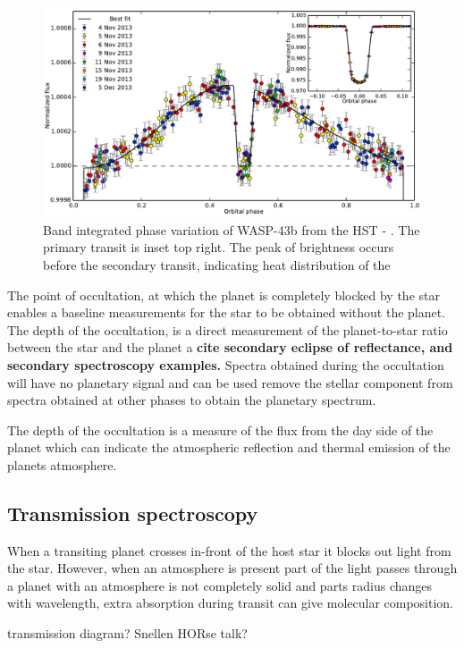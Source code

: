 \begin{figure}
    \centering
    \includegraphics[width=0.6\linewidth]{figures/introduction/stevenson_phasecurve2014}
    \caption{Band integrated phase variation of WASP-43b from the HST - \cite{stevenson_thermal_2014}. The primary transit is inset top right.
        The peak of brightness occurs before the secondary transit, indicating heat distribution of the }
    \label{fig:stevensonphasecurve2014}
\end{figure}

The point of occultation, at which the planet is completely blocked by the star enables a baseline measurements for the star to be obtained without the planet. The depth of the occultation, is a direct measurement of the planet-to-star ratio between the star and the planet a \textbf{{cite secondary eclipse of reflectance, and secondary spectroscopy examples}.} Spectra obtained during the occultation will have no planetary signal and can be used remove the stellar component from spectra obtained at other phases to obtain the planetary spectrum.


The depth of the occultation is a measure of the flux from the day side of the planet which can indicate the atmospheric reflection and thermal emission of the planets atmosphere.





\subsection{Transmission spectroscopy}
When a transiting planet crosses in-front of the host star it blocks out light from the star. However, when an atmosphere is present part of the light passes through  a planet with an atmosphere is not completely solid and parts
radius changes with wavelength, extra absorption during transit can give molecular composition.


transmission diagram? Snellen HORse talk?

